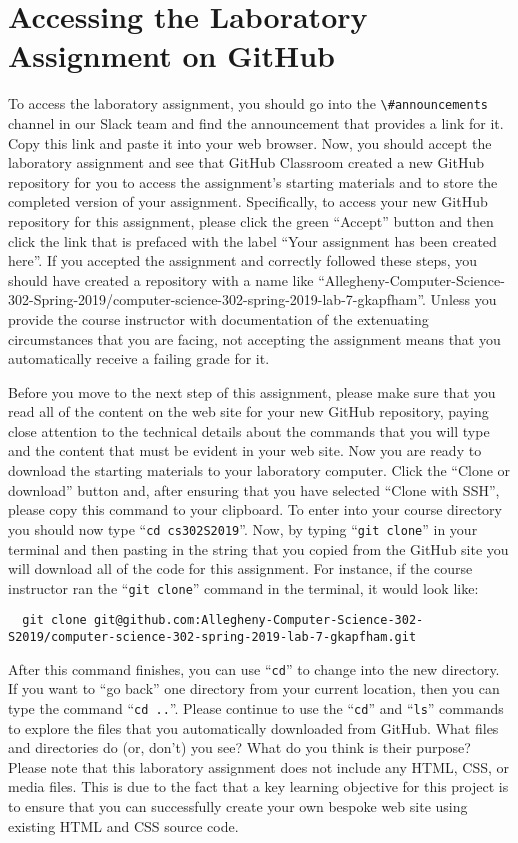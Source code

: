 \documentclass[11pt]{article}
\newcommand{\command}[1]{``\lstinline{#1}''}
\newcommand{\channel}[1]{\lstinline{#1}}
\newcommand{\step}[1]{``{#1}''}
\begin{document}
\section*{Accessing the Laboratory Assignment on GitHub}

To access the laboratory assignment, you should go into the
\channel{\#announcements} channel in our Slack team and find the announcement
that provides a link for it. Copy this link and paste it into your web browser.
Now, you should accept the laboratory assignment and see that GitHub Classroom
created a new GitHub repository for you to access the assignment's starting
materials and to store the completed version of your assignment. Specifically,
to access your new GitHub repository for this assignment, please click the green
``Accept'' button and then click the link that is prefaced with the label ``Your
assignment has been created here''. If you accepted the assignment and correctly
followed these steps, you should have created a repository with a name like
``Allegheny-Computer-Science-302-Spring-2019/computer-science-302-spring-2019-lab-7-gkapfham''.
Unless you provide the course instructor with documentation of the extenuating
circumstances that you are facing, not accepting the assignment means that you
automatically receive a failing grade for it.

Before you move to the next step of this assignment, please make sure that you
read all of the content on the web site for your new GitHub repository, paying
close attention to the technical details about the commands that you will type
and the content that must be evident in your web site. Now you are ready to
download the starting materials to your laboratory computer. Click the ``Clone
or download'' button and, after ensuring that you have selected ``Clone with
SSH'', please copy this command to your clipboard. To enter into your course
directory you should now type \command{cd cs302S2019}. Now, by typing
\command{git clone} in your terminal and then pasting in the string that you
copied from the GitHub site you will download all of the code for this
assignment. For instance, if the course instructor ran the \command{git clone}
command in the terminal, it would look like:

\begin{lstlisting}
  git clone git@github.com:Allegheny-Computer-Science-302-S2019/computer-science-302-spring-2019-lab-7-gkapfham.git
\end{lstlisting}

After this command finishes, you can use \command{cd} to change into the new
directory. If you want to \step{go back} one directory from your current
location, then you can type the command \command{cd ..}. Please continue to use
the \command{cd} and \command{ls} commands to explore the files that you
automatically downloaded from GitHub. What files and directories do (or, don't)
you see? What do you think is their purpose? Please note that this laboratory
assignment does not include any HTML, CSS, or media files. This is due to the
fact that a key learning objective for this project is to ensure that you can
successfully create your own bespoke web site using existing HTML and CSS source
code.
\end{document}
